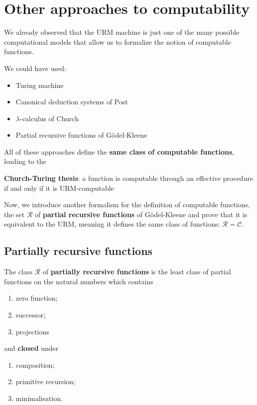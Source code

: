 \chapter{Other approaches to computability}
We already observed that the URM machine is just one of the many possible computational models that allow us to formalize the notion of computable functions.

We could have used:
\begin{itemize}
\item Turing machine
\item Canonical deduction systems of Post
\item $\lambda$-calculus of Church
\item Partial recursive functions of Gödel-Kleene
\end{itemize}

All of these approaches define the \textbf{same class of computable functions}, leading to the

\textbf{Church-Turing thesis}: a function is computable through an effective procedure 
if and only if it is URM-computable

Now, we introduce another formalism for the definition of computable functions, the set $\mathcal{R}$ of \textbf{partial recursive functions} of Gödel-Kleene and prove that it is equivalent to the URM, meaning it defines the same class of functions: $\mathcal{R} = \mathcal{C}$.

\section{Partially recursive functions}

\begin{definition}
  The class $ \mathcal{R} $ of \textbf{partially recursive functions} is the least class of partial functions on the natural numbers which contains
  \begin{enumerate}[label=(\alph*)]
    \item zero function;
    \item successor;
    \item projections
    \end{enumerate}
    
    and \textbf{closed} under
    \begin{enumerate}
    \item composition;
    \item primitive recursion;
    \item minimalisation.
    \end{enumerate}
\end{definition}

